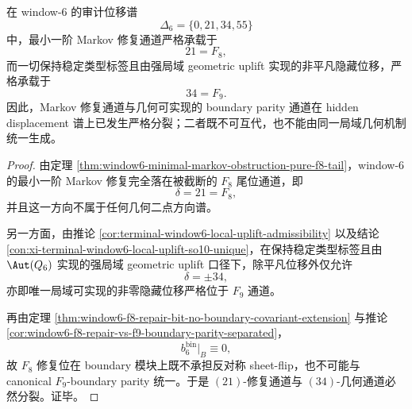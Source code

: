 \begin{theorem}\label{thm:conclusion-window6-hidden-displacement-21-34-splitting}
在 window-\(6\) 的审计位移谱
\[
\Delta_6=\{0,21,34,55\}
\]
中，最小一阶 Markov 修复通道严格承载于
\[
21=F_8,
\]
而一切保持稳定类型标签且由强局域 geometric uplift 实现的非平凡隐藏位移，严格承载于
\[
34=F_9.
\]
因此，Markov 修复通道与几何可实现的 boundary parity 通道在 hidden displacement 谱上已发生严格分裂；二者既不可互代，也不能由同一局域几何机制统一生成。
\end{theorem}
\begin{proof}
由定理 \ref{thm:window6-minimal-markov-obstruction-pure-f8-tail}，window-\(6\) 的最小一阶 Markov 修复完全落在被截断的 \(F_8\) 尾位通道，即
\[
\delta=21=F_8,
\]
并且这一方向不属于任何几何二点方向谱。

另一方面，由推论 \ref{cor:terminal-window6-local-uplift-admissibility} 以及结论 \ref{con:xi-terminal-window6-local-uplift-so10-unique}，在保持稳定类型标签且由 \(\Aut(Q_6)\) 实现的强局域 geometric uplift 口径下，除平凡位移外仅允许
\[
\delta=\pm 34,
\]
亦即唯一局域可实现的非零隐藏位移严格位于 \(F_9\) 通道。

再由定理 \ref{thm:window6-f8-repair-bit-no-boundary-covariant-extension} 与推论 \ref{cor:window6-f8-repair-vs-f9-boundary-parity-separated}，
\[
b_6^{\mathrm{bin}}|_B\equiv 0,
\]
故 \(F_8\) 修复位在 boundary 模块上既不承担反对称 sheet-flip，也不可能与 canonical \(F_9\)-boundary parity 统一。于是 \((21)\)-修复通道与 \((34)\)-几何通道必然分裂。证毕。
\end{proof}

